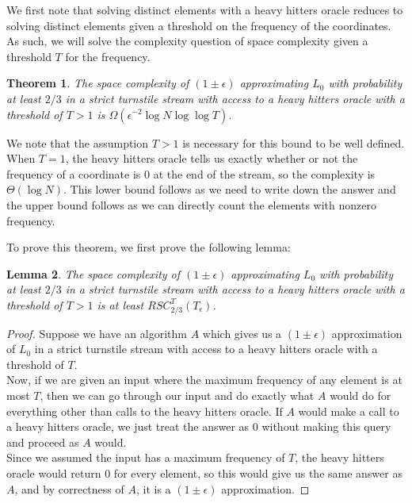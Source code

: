 \documentclass[11pt]{article}
\numberwithin{equation}{section}
\newtheorem{theorem}{Theorem}[section]
\newtheorem{lemma}[theorem]{Lemma}
\theoremstyle{definition}
\theoremstyle{plain}
\begin{document}
We first note that solving distinct elements with a heavy hitters oracle reduces to solving distinct elements given a threshold on the frequency of the coordinates. As such, we will solve the complexity question of space complexity given a threshold $T$ for the frequency.

\begin{theorem}
\label{thm:streaming_bound}
The space complexity of $(1\pm \epsilon)$ approximating $L_0$ with probability at least $2/3$ in a strict turnstile stream with access to a heavy hitters oracle with a threshold of $T > 1$ is $\Omega(\epsilon^{-2} \log N \log \log T)$.
\end{theorem}

We note that the assumption $T > 1$ is necessary for this bound to be well defined. When $T=1$, the heavy hitters oracle tells us exactly whether or not the frequency of a coordinate is $0$ at the end of the stream, so the complexity is $\Theta(\log N)$. This lower bound follows as we need to write down the answer and the upper bound follows as we can directly count the elements with nonzero frequency.

To prove this theorem, we first prove the following lemma:

\begin{lemma}
\label{thm:promise_reduction}
The space complexity of $(1\pm \epsilon)$ approximating $L_0$ with probability at least $2/3$ in a strict turnstile stream with access to a heavy hitters oracle with a threshold of $T > 1$ is at least $RSC^T_{2/3}(T_\epsilon)$.
\end{lemma}
\begin{proof}
Suppose we have an algorithm $A$ which gives us a $(1\pm \epsilon)$ approximation of $L_0$ in a strict turnstile stream with access to a heavy hitters oracle with a threshold of $T$.\\

Now, if we are given an input where the maximum frequency of any element is at most $T$, then we can go through our input and do exactly what $A$ would do for everything other than calls to the heavy hitters oracle. If $A$ would make a call to a heavy hitters oracle, we just treat the answer as $0$ without making this query and proceed as $A$ would.\\

Since we assumed the input has a maximum frequency of $T$, the heavy hitters
oracle would return $0$ for every element, so this would give 
us the same answer as $A$, and by correctness of $A$, it is a $(1\pm \epsilon)$
approximation. %
\end{proof}
\end{document}
